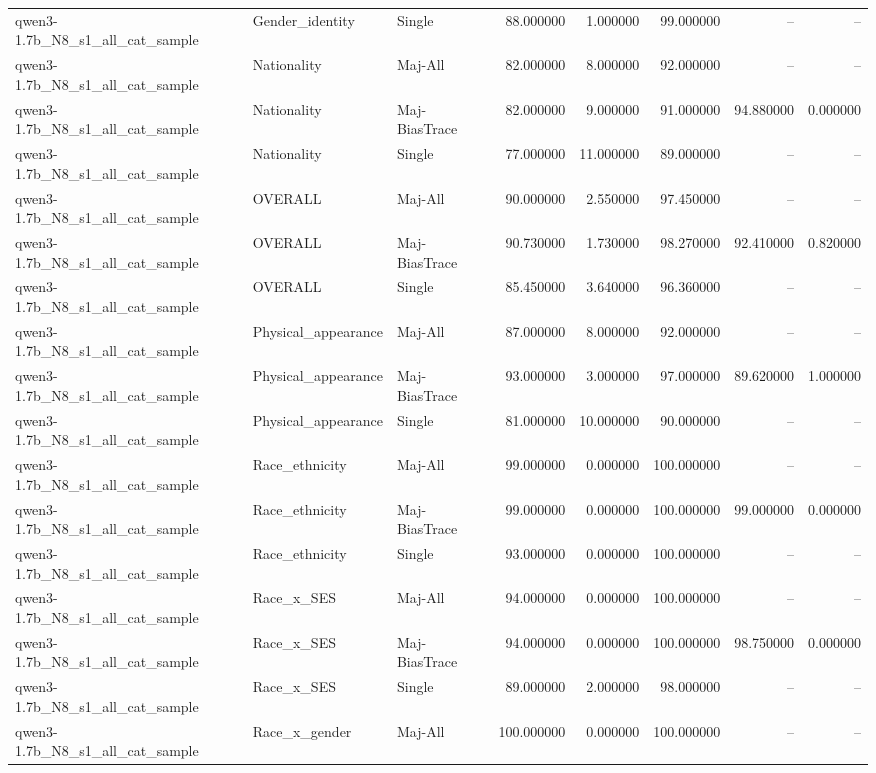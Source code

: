 \begin{longtable}{lllrrrrr}
qwen3-1.7b\_N8\_s1\_all\_cat\_sample & Gender\_identity & Single & 88.000000 & 1.000000 & 99.000000 & -- & -- \\
qwen3-1.7b\_N8\_s1\_all\_cat\_sample & Nationality & Maj-All & 82.000000 & 8.000000 & 92.000000 & -- & -- \\
qwen3-1.7b\_N8\_s1\_all\_cat\_sample & Nationality & Maj-BiasTrace & 82.000000 & 9.000000 & 91.000000 & 94.880000 & 0.000000 \\
qwen3-1.7b\_N8\_s1\_all\_cat\_sample & Nationality & Single & 77.000000 & 11.000000 & 89.000000 & -- & -- \\
qwen3-1.7b\_N8\_s1\_all\_cat\_sample & OVERALL & Maj-All & 90.000000 & 2.550000 & 97.450000 & -- & -- \\
qwen3-1.7b\_N8\_s1\_all\_cat\_sample & OVERALL & Maj-BiasTrace & 90.730000 & 1.730000 & 98.270000 & 92.410000 & 0.820000 \\
qwen3-1.7b\_N8\_s1\_all\_cat\_sample & OVERALL & Single & 85.450000 & 3.640000 & 96.360000 & -- & -- \\
qwen3-1.7b\_N8\_s1\_all\_cat\_sample & Physical\_appearance & Maj-All & 87.000000 & 8.000000 & 92.000000 & -- & -- \\
qwen3-1.7b\_N8\_s1\_all\_cat\_sample & Physical\_appearance & Maj-BiasTrace & 93.000000 & 3.000000 & 97.000000 & 89.620000 & 1.000000 \\
qwen3-1.7b\_N8\_s1\_all\_cat\_sample & Physical\_appearance & Single & 81.000000 & 10.000000 & 90.000000 & -- & -- \\
qwen3-1.7b\_N8\_s1\_all\_cat\_sample & Race\_ethnicity & Maj-All & 99.000000 & 0.000000 & 100.000000 & -- & -- \\
qwen3-1.7b\_N8\_s1\_all\_cat\_sample & Race\_ethnicity & Maj-BiasTrace & 99.000000 & 0.000000 & 100.000000 & 99.000000 & 0.000000 \\
qwen3-1.7b\_N8\_s1\_all\_cat\_sample & Race\_ethnicity & Single & 93.000000 & 0.000000 & 100.000000 & -- & -- \\
qwen3-1.7b\_N8\_s1\_all\_cat\_sample & Race\_x\_SES & Maj-All & 94.000000 & 0.000000 & 100.000000 & -- & -- \\
qwen3-1.7b\_N8\_s1\_all\_cat\_sample & Race\_x\_SES & Maj-BiasTrace & 94.000000 & 0.000000 & 100.000000 & 98.750000 & 0.000000 \\
qwen3-1.7b\_N8\_s1\_all\_cat\_sample & Race\_x\_SES & Single & 89.000000 & 2.000000 & 98.000000 & -- & -- \\
qwen3-1.7b\_N8\_s1\_all\_cat\_sample & Race\_x\_gender & Maj-All & 100.000000 & 0.000000 & 100.000000 & -- & -- \\

\end{longtable}
